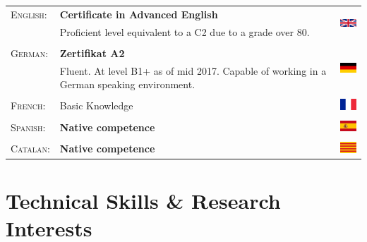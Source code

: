 \documentclass[a4paper,10pt]{article} %
\begin{document}
\begin{tabular}{R{3cm}L{10cm}C{2cm}}
\textsc{English:} & \textbf{Certificate in Advanced English} &  \\
 & Proficient level equivalent to a C2 due to a grade over 80. & \\
& & \\
\textsc{German:} & \textbf{Zertifikat A2} &  \\
 & Fluent. At level B1+ as of mid 2017. Capable of working in a German speaking environment. \\
 & & \\[-5pt]
\textsc{French:} & Basic Knowledge & \includegraphics[width=1cm]{img/french} \\
& & \\[-5pt]
\textsc{Spanish:} & \textbf{Native competence} & \includegraphics[width=1cm]{img/spain} \\
 & & \\[-7pt]
\textsc{Catalan:} & \textbf{Native competence} & \includegraphics[width=1cm]{img/catalan.png} \\
\end{tabular}



\section{Technical Skills \& Research Interests}
\end{document}
